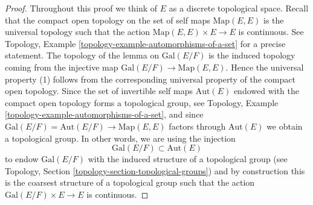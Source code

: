 \begin{proof}

Throughout this proof we think of $E$ as a discrete topological space.
Recall that the compact open topology on the set of self maps
$\text{Map}(E, E)$ is the universal topology such that the action
$\text{Map}(E, E) \times E \to E$ is continuous. See
Topology, Example \ref{topology-example-automorphisms-of-a-set}
for a precise statement. The topology of the lemma on
$\text{Gal}(E/F)$ is the induced topology coming from the
injective map $\text{Gal}(E/F) \to \text{Map}(E, E)$.
Hence the universal property (1) follows from the corresponding
universal property of the compact open topology.
Since the set of invertible self maps $\text{Aut}(E)$
endowed with the compact open topology forms a topological group, see
Topology, Example \ref{topology-example-automorphisms-of-a-set},
and since $\text{Gal}(E/F) = \text{Aut}(E/F) \to \text{Map}(E, E)$
factors through $\text{Aut}(E)$ we obtain a topological group.
In other words, we are using the injection
$$
\text{Gal}(E/F) \subset \text{Aut}(E)
$$
to endow $\text{Gal}(E/F)$ with the induced structure of a topological group
(see Topology, Section \ref{topology-section-topological-groups})
and by construction this is the coarsest structure of a topological
group such that the action $\text{Gal}(E/F) \times E \to E$ is continuous.


\end{proof}
